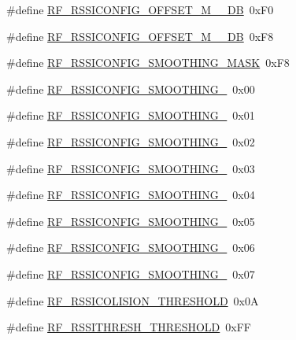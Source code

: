 \begin{DoxyCompactItemize}
\#define \hyperlink{sx1276Regs-Fsk_8h_a07f627585a0fb052af36c054b1aa998d}{R\+F\+\_\+\+R\+S\+S\+I\+C\+O\+N\+F\+I\+G\+\_\+\+O\+F\+F\+S\+E\+T\+\_\+\+M\+\_\+\_\+\+DB}~0x\+F0
\item 
\#define \hyperlink{sx1276Regs-Fsk_8h_a1bda3872a2df71ff4834111e75210880}{R\+F\+\_\+\+R\+S\+S\+I\+C\+O\+N\+F\+I\+G\+\_\+\+O\+F\+F\+S\+E\+T\+\_\+\+M\+\_\+\_\+\+DB}~0x\+F8
\item 
\#define \hyperlink{sx1276Regs-Fsk_8h_a8ff6402df6371ff0d43d3cc044cd24ae}{R\+F\+\_\+\+R\+S\+S\+I\+C\+O\+N\+F\+I\+G\+\_\+\+S\+M\+O\+O\+T\+H\+I\+N\+G\+\_\+\+M\+A\+SK}~0x\+F8
\item 
\#define \hyperlink{sx1276Regs-Fsk_8h_ab42a5844e4a21615cbe58162237dd17f}{R\+F\+\_\+\+R\+S\+S\+I\+C\+O\+N\+F\+I\+G\+\_\+\+S\+M\+O\+O\+T\+H\+I\+N\+G\+\_}~0x00
\item 
\#define \hyperlink{sx1276Regs-Fsk_8h_af10e6a0d1b88f5750047c1a87c5cdd7c}{R\+F\+\_\+\+R\+S\+S\+I\+C\+O\+N\+F\+I\+G\+\_\+\+S\+M\+O\+O\+T\+H\+I\+N\+G\+\_}~0x01
\item 
\#define \hyperlink{sx1276Regs-Fsk_8h_a3edb9e3f6851690fc218c719ca858763}{R\+F\+\_\+\+R\+S\+S\+I\+C\+O\+N\+F\+I\+G\+\_\+\+S\+M\+O\+O\+T\+H\+I\+N\+G\+\_}~0x02
\item 
\#define \hyperlink{sx1276Regs-Fsk_8h_a796004e51661fdbde6d228017452dbfe}{R\+F\+\_\+\+R\+S\+S\+I\+C\+O\+N\+F\+I\+G\+\_\+\+S\+M\+O\+O\+T\+H\+I\+N\+G\+\_}~0x03
\item 
\#define \hyperlink{sx1276Regs-Fsk_8h_af3544ebacc23f2f0da15339288abd88b}{R\+F\+\_\+\+R\+S\+S\+I\+C\+O\+N\+F\+I\+G\+\_\+\+S\+M\+O\+O\+T\+H\+I\+N\+G\+\_}~0x04
\item 
\#define \hyperlink{sx1276Regs-Fsk_8h_aae348ea0ba017e4bc7ce0ad98205a9a6}{R\+F\+\_\+\+R\+S\+S\+I\+C\+O\+N\+F\+I\+G\+\_\+\+S\+M\+O\+O\+T\+H\+I\+N\+G\+\_}~0x05
\item 
\#define \hyperlink{sx1276Regs-Fsk_8h_a65690fc4263834d89464b781dfbf0abe}{R\+F\+\_\+\+R\+S\+S\+I\+C\+O\+N\+F\+I\+G\+\_\+\+S\+M\+O\+O\+T\+H\+I\+N\+G\+\_}~0x06
\item 
\#define \hyperlink{sx1276Regs-Fsk_8h_ab1e32dfa6c5a4e8707b17a39d4c952f2}{R\+F\+\_\+\+R\+S\+S\+I\+C\+O\+N\+F\+I\+G\+\_\+\+S\+M\+O\+O\+T\+H\+I\+N\+G\+\_}~0x07
\item 
\#define \hyperlink{sx1276Regs-Fsk_8h_ad81b4cc0e3351a069dc394f00a68b24b}{R\+F\+\_\+\+R\+S\+S\+I\+C\+O\+L\+I\+S\+I\+O\+N\+\_\+\+T\+H\+R\+E\+S\+H\+O\+LD}~0x0A
\item 
\#define \hyperlink{sx1276Regs-Fsk_8h_ae89a3fe6abf9275ab02fa1ab30aefb8d}{R\+F\+\_\+\+R\+S\+S\+I\+T\+H\+R\+E\+S\+H\+\_\+\+T\+H\+R\+E\+S\+H\+O\+LD}~0x\+FF

\end{DoxyCompactItemize}
